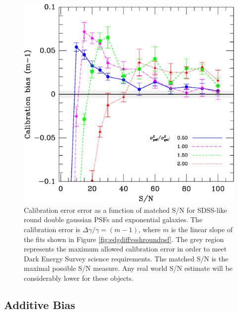 \documentclass[12pt,preprint]{aastex}
\newcommand{\psf}{PSF}
\begin{document}
\begin{figure}[t] \centering
 \centering 
 \includegraphics[scale=0.65]{figures/set-s2n-edg02-m-vs-shear.eps}

 \caption{Calibration error error as a function of matched S/N for SDSS-like
 round double gaussian \psf s and exponential galaxies.  The calibration error is
 $\Delta \gamma/\gamma = (m-1)$, where $m$ is the linear slope of the fits shown in
 Figure \ref{fig:edgdiffvsshroundpsf}.  The grey region represents the maximum
 allowed calibration error in order to meet Dark Energy Survey science
 requirements.  The matched S/N is the maximal possible S/N measure.  Any real
 world S/N estimate will be considerably lower for these objects.} 

 \label{fig:edgcaliberr}

\end{figure}

\subsection{Additive Bias}
\end{document}
